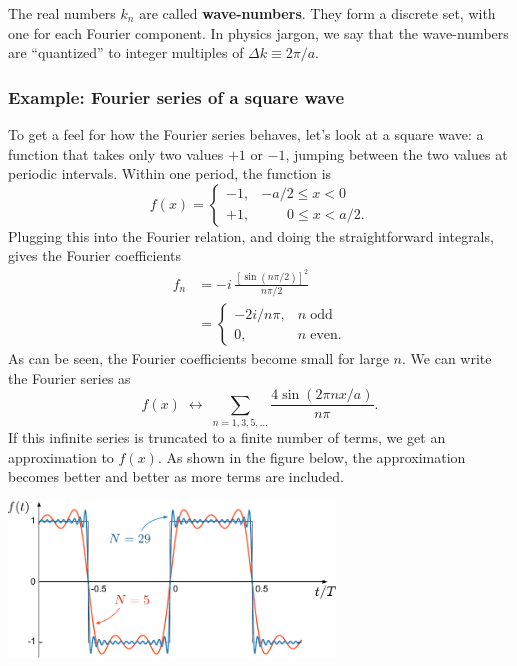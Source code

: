 \documentclass[10pt,a4paper]{article}
\begin{document}
\noindent
The real numbers $k_n$ are called \textbf{wave-numbers}. They form a
discrete set, with one for each Fourier component. In physics jargon, we
say that the wave-numbers are ``quantized'' to integer multiples of
$\Delta k \equiv 2\pi/a.$

\subsubsection{Example: Fourier series of a square wave}
\label{example-fourier-series-of-a-square-wave}

To get a feel for how the Fourier series behaves, let's look at a
square wave: a function that takes only two values $+1$ or $-1$,
jumping between the two values at periodic intervals. Within one
period, the function is
\begin{equation}
  f(x) = \left\{\begin{array}{ll}-1, & -a/2 \le x < 0 \\ +1, & \quad\;\;\; 0 \le x < a/2.\end{array}\right.
\end{equation}
Plugging this into the Fourier relation, and doing the straightforward
integrals, gives the Fourier coefficients
\begin{align}
  f_n &= -i \, \frac{\left[\sin\left(n \pi/2\right)\right]^2}{n\pi/2 } \\
  &= \left\{\begin{array}{cl} -2i/n\pi ,& n \; \mathrm{odd} \\
  0,& n \; \mathrm{even}.
  \end{array}
  \right.
\end{align}
As can be seen, the Fourier coefficients become small for large $n$.
We can write the Fourier series as
\begin{equation}
f(x) \; \leftrightarrow \; \sum_{n=1,3,5,\dots} \frac{4\sin(2\pi n x / a)}{n \pi}.
\end{equation}
If this infinite series is truncated to a finite number of terms, we
get an approximation to $f(x)$. As shown in the figure below, the
approximation becomes better and better as more terms are included.

\begin{center}
  \includegraphics[width=0.65\textwidth]{square_fourier}
\end{center}
\end{document}
